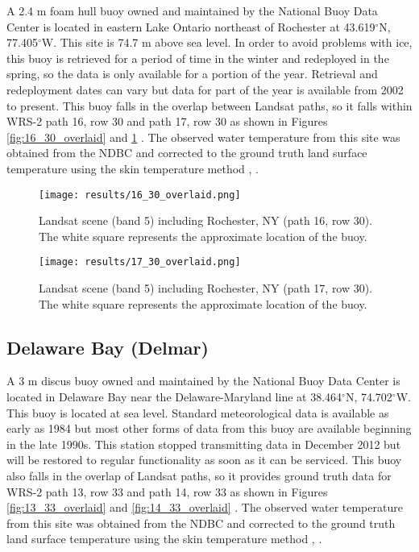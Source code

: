 \documentclass{book}
\begin{document}
A 2.4 m foam hull buoy owned and maintained by the National Buoy Data Center is located in eastern Lake Ontario northeast of Rochester at 43.619$^\circ$N, 77.405$^\circ$W.  This site is 74.7 m above sea level.  In order to avoid problems with ice, this buoy is retrieved for a period of time in the winter and redeployed in the spring, so the data is only available for a portion of the year.  Retrieval and redeployment dates can vary but data for part of the year is available from 2002 to present.  This buoy falls in the overlap between Landsat paths, so it falls within WRS-2 path 16, row 30 and path 17, row 30 as shown in Figures \ref{fig:16_30_overlaid} and \ref{fig:17_30_overlaid} \cite{ndbc_rochester}.  The observed water temperature from this site was obtained from the NDBC and corrected to the ground truth land surface temperature using the skin temperature method \cite{schott_2012}, \cite{schott_2010}.

\begin{figure}[H]
\begin{minipage}[b]{0.5\linewidth}
\centering
\texttt{[image: results/16\_30\_overlaid.png]}
\caption{Landsat scene (band 5) including Rochester, NY (path 16, row 30).  The white square represents the approximate location of the buoy.}
\label{fig:16_30_overlaid}
\end{minipage}
\hspace{0.5cm}
\begin{minipage}[b]{0.5\linewidth}
\centering
\texttt{[image: results/17\_30\_overlaid.png]}
\caption{Landsat scene (band 5) including Rochester, NY (path 17, row 30).  The white square represents the approximate location of the buoy.}
\label{fig:17_30_overlaid}
\end{minipage}
\end{figure}

\subsection{Delaware Bay (Delmar)}
\label{sec:delmar}

A 3 m discus buoy owned and maintained by the National Buoy Data Center is located in Delaware Bay near the Delaware-Maryland line at 38.464$^\circ$N, 74.702$^\circ$W.  This buoy is located at sea level.  Standard meteorological data is available as early as 1984 but most other forms of data from this buoy are available beginning in the late 1990s.  This station stopped transmitting data in December 2012 but will be restored to regular functionality as soon as it can be serviced.  This buoy also falls in the overlap of Landsat paths, so it provides ground truth data for WRS-2 path 13, row 33 and path 14, row 33 as shown in Figures \ref{fig:13_33_overlaid} and \ref{fig:14_33_overlaid} \cite{ndbc_delmar}.  The observed water temperature from this site was obtained from the NDBC and corrected to the ground truth land surface temperature using the skin temperature method \cite{schott_2012}, \cite{schott_2010}.
\end{document}
